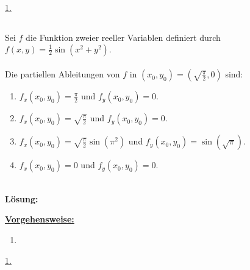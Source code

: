 \underline{1. }\\

\newpage

\subsection*{}
Sei $f$ die Funktion zweier reeller Variablen definiert durch $f(x,y) = \frac{1}{2} \sin(x^2 +y^2).$\\
\\
Die partiellen Ableitungen von $f$ in $(x_0, y_0) = \left(\sqrt{\frac{\pi}{2}}, 0 \right)$ sind:
\renewcommand{\labelenumi}{(\alph{enumi})}
\begin{enumerate}
	\item 
	$f_x(x_0,y_0) = \frac{\pi}{2}$ und $f_y(x_0,y_0) = 0$.
	\item
	$f_x(x_0,y_0) =  \sqrt{\frac{\pi}{2}} $ und $f_y(x_0,y_0) = 0$.
	\item
	$f_x(x_0,y_0) = \sqrt{\frac{\pi}{2}} \sin(\pi^2) $ und $f_y(x_0,y_0) = \sin(\sqrt{\pi})$.
	\item
	$f_x(x_0,y_0) = 0 $ und $f_y(x_0,y_0) = 0$.
\end{enumerate}
\ \\
\textbf{Lösung:}
\begin{mdframed}
\underline{\textbf{Vorgehensweise:}}
\renewcommand{\labelenumi}{\theenumi.}
\begin{enumerate}
\item 
\end{enumerate}
\end{mdframed}

\underline{1. }\\



\newpage

